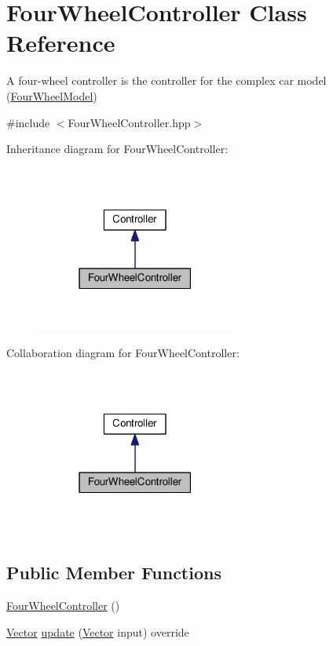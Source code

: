 \hypertarget{classFourWheelController}{}\section{Four\+Wheel\+Controller Class Reference}
\label{classFourWheelController}


A four-\/wheel controller is the controller for the complex car model (\hyperlink{classFourWheelModel}{Four\+Wheel\+Model})  




{\ttfamily \#include $<$Four\+Wheel\+Controller.\+hpp$>$}



Inheritance diagram for Four\+Wheel\+Controller\+:\nopagebreak
\begin{figure}[H]
\begin{center}
\leavevmode
\includegraphics[width=186pt]{classFourWheelController__inherit__graph}
\end{center}
\end{figure}


Collaboration diagram for Four\+Wheel\+Controller\+:\nopagebreak
\begin{figure}[H]
\begin{center}
\leavevmode
\includegraphics[width=186pt]{classFourWheelController__coll__graph}
\end{center}
\end{figure}
\subsection*{Public Member Functions}
\begin{DoxyCompactItemize}
\item 
\hyperlink{classFourWheelController_ada2276db9e38f1cdfd2506988b5ca5bb}{Four\+Wheel\+Controller} ()
\item 
\hyperlink{Agent_8hpp_a5dd127bb3cb18b011cf5fd80a906e830}{Vector} \hyperlink{classFourWheelController_a2db0c3dac61cec36963c9b1c9c7ddeef}{update} (\hyperlink{Agent_8hpp_a5dd127bb3cb18b011cf5fd80a906e830}{Vector} input) override
\end{DoxyCompactItemize}
